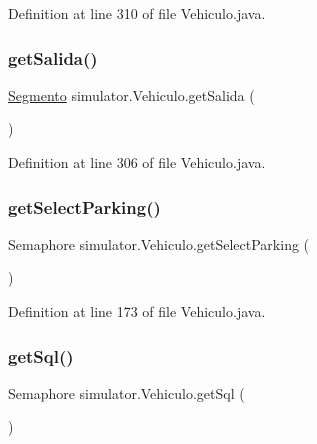 Definition at line 310 of file Vehiculo.\+java.

\mbox{\label{classsimulator_1_1_vehiculo_ad3da0b0e11fbf762c9efbc02af14791a}} 
\subsubsection{\texorpdfstring{get\+Salida()}{getSalida()}}
{\footnotesize\ttfamily \mbox{\hyperlink{classsimulator_1_1_segmento}{Segmento}} simulator.\+Vehiculo.\+get\+Salida (\begin{DoxyParamCaption}{ }\end{DoxyParamCaption})}



Definition at line 306 of file Vehiculo.\+java.

\mbox{\label{classsimulator_1_1_vehiculo_afff145cddc29699082dab8c05d18137d}} 
\subsubsection{\texorpdfstring{get\+Select\+Parking()}{getSelectParking()}}
{\footnotesize\ttfamily Semaphore simulator.\+Vehiculo.\+get\+Select\+Parking (\begin{DoxyParamCaption}{ }\end{DoxyParamCaption})}



Definition at line 173 of file Vehiculo.\+java.

\mbox{\label{classsimulator_1_1_vehiculo_a5dfc609221e17e725449964f7482b109}} 
\subsubsection{\texorpdfstring{get\+Sql()}{getSql()}}
{\footnotesize\ttfamily Semaphore simulator.\+Vehiculo.\+get\+Sql (\begin{DoxyParamCaption}{ }\end{DoxyParamCaption})}



